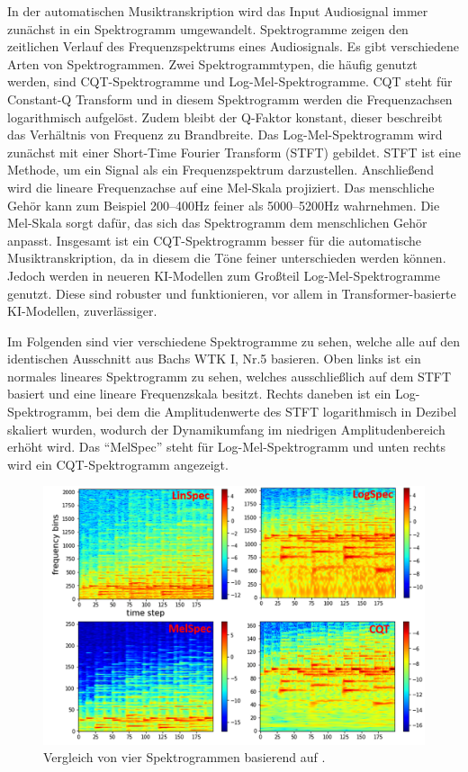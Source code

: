 \begin{description}[style=nextline]
\item[Spektrogramme]\label{itm:spektrogramm}
In der automatischen Musiktranskription wird das Input Audiosignal immer zunächst in ein Spektrogramm umgewandelt.
Spektrogramme zeigen den zeitlichen Verlauf des Frequenzspektrums eines Audiosignals.
Es gibt verschiedene Arten von Spektrogrammen.
Zwei Spektrogrammtypen, die häufig genutzt werden, sind CQT-Spektrogramme und Log-Mel-Spektrogramme.
CQT steht für Constant-Q Transform und in diesem Spektrogramm werden die Frequenzachsen logarithmisch aufgelöst.
Zudem bleibt der Q-Faktor konstant, dieser beschreibt das Verhältnis von Frequenz zu Brandbreite.
Das Log-Mel-Spektrogramm wird zunächst mit einer Short-Time Fourier Transform (STFT) gebildet.
STFT ist eine Methode, um ein Signal als ein Frequenzspektrum darzustellen.
Anschließend wird die lineare Frequenzachse auf eine Mel-Skala projiziert.
Das menschliche Gehör kann zum Beispiel 200--400Hz feiner als 5000--5200Hz wahrnehmen.
Die Mel-Skala sorgt dafür, das sich das Spektrogramm dem menschlichen Gehör anpasst.
Insgesamt ist ein CQT-Spektrogramm besser für die automatische Musiktranskription,
da in diesem die Töne feiner unterschieden werden können.
Jedoch werden in neueren KI-Modellen zum Großteil Log-Mel-Spektrogramme genutzt.
Diese sind robuster und funktionieren, vor allem in Transformer-basierte KI-Modellen, zuverlässiger.

Im Folgenden sind vier verschiedene Spektrogramme zu sehen,
welche alle auf den identischen Ausschnitt aus Bachs WTK I, Nr.5 \cite{bach_wtk1_nr5} basieren.
Oben links ist ein normales lineares Spektrogramm zu sehen,
welches ausschließlich auf dem STFT basiert und eine lineare Frequenzskala besitzt.
Rechts daneben ist ein Log-Spektrogramm,
bei dem die Amplitudenwerte des STFT logarithmisch in Dezibel skaliert wurden,
wodurch der Dynamikumfang im niedrigen Amplitudenbereich erhöht wird.
Das \enquote{MelSpec} steht für Log-Mel-Spektrogramm und unten rechts wird ein CQT-Spektrogramm angezeigt.
\begin{figure}[H]
    \centering
    \includegraphics[width=1\textwidth]{Graphics/different_spectrograms}
    \caption[Vergleich 4 Spektrogramme]{Vergleich von vier Spektrogrammen basierend auf  \cite{cheuk2020impact}.}
    \label{fig:different_specs}
\end{figure}
\end{description}

